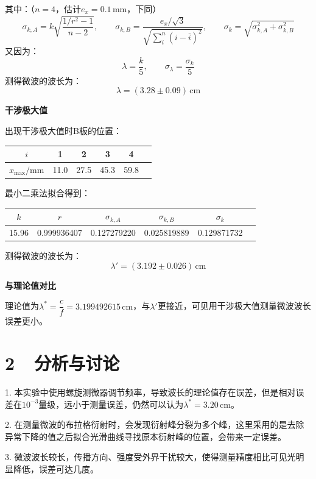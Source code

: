 \documentclass[a4paper,fontset=windows]{ctexbook}
\begin{document}
    其中：（$n = 4$，估计$e_x = 0.1\,\mathrm{mm}$，下同）
    \[
    \sigma_{k,A} = k\sqrt{\frac{1/r^2 - 1}{n - 2}},\qquad
    \sigma_{k,B} = \frac{e_x/\sqrt{3}}{\sqrt{\sum\limits_i^n(i - \overline{i})^2}},\qquad
    \sigma_k = \sqrt{\sigma_{k,A}^2 + \sigma_{k,B}^2}
    \]
    又因为：
    \[
    \lambda = \dfrac{k}{5},\qquad \sigma_\lambda = \dfrac{\sigma_k}{5}
    \]
    测得微波的波长为：
    \[
    \lambda = (3.28\pm0.09)\,\mathrm{cm}
    \]
    
    \bigskip
    {\large\textbf{干涉极大值}}
    
    出现干涉极大值时B板的位置：
    
    \begin{table}[!htbp]
        \begin{center}
            \begin{tabular}{|c|c|c|c|c|c|}
                \hline
                $i$ & 1 & 2 & 3 & 4 \\
                \hline
                $x_{\mathrm{max}}/\mathrm{mm}$ & 11.0 & 27.5 & 45.3 & 59.8 \\
                \hline
            \end{tabular}
        \end{center}
    \end{table}
    
    最小二乘法拟合得到：
    
    \begin{table}[!htbp]
        \begin{center}
            \begin{tabular}{|c|c|c|c|c|c|}
                \hline
                $k$ & $r$ & $\sigma_{k,A}$ & $\sigma_{k,B}$ & $\sigma_k$ \\
                \hline
                15.96 & 0.999936407 & 0.127279220 & 0.025819889 & 0.129871732 \\
                \hline
            \end{tabular}
        \end{center}
    \end{table}
    
    测得微波的波长为：
    \[
    \lambda' = (3.192\pm0.026)\,\mathrm{cm}
    \]
    
    \bigskip
    {\large\textbf{与理论值对比}}
    
    理论值为$\lambda^* = \dfrac{c}{f} = 3.199492615\,\mathrm{cm}$，与$\lambda'$更接近，可见用干涉极大值测量微波波长误差更小。

    \section*{2\ \ 分析与讨论}
    
    1. 本实验中使用螺旋测微器调节频率，导致波长的理论值存在误差，但是相对误差在$10^{-3}$量级，远小于测量误差，仍然可以认为$\lambda^* = 3.20\,\mathrm{cm}$。
        
    2. 在测量微波的布拉格衍射时，会发现衍射峰分裂为多个峰，这里采用的是去除异常下降的值之后拟合光滑曲线寻找原本衍射峰的位置，会带来一定误差。
    
    3. 微波波长较长，传播方向、强度受外界干扰较大，使得测量精度相比可见光明显降低，误差可达几度。
\end{document}
